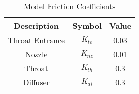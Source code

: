 \begin{table}[h]
\centering
\begin{tabular}{|c|c|c|}
\hline
Description & Symbol & Value \\
\hline
Throat Entrance & $K_{te}$ & 0.03 \\
Nozzle & $K_{nz}$ & 0.01 \\
Throat & $K_{th}$ & 0.3 \\
Diffuser & $K_{di}$ & 0.3 \\
\hline
\end{tabular}
\caption{Model Friction Coefficients}
\label{tab:fric_coeff_model}
\end{table}